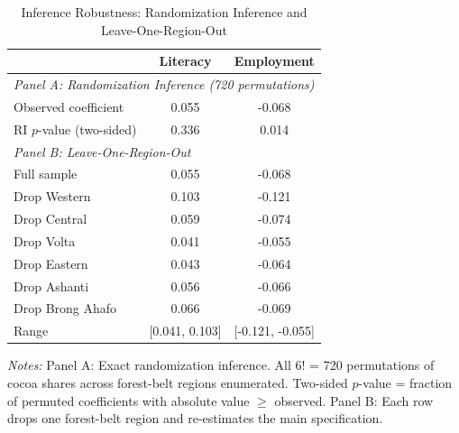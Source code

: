\begin{table}[htbp]
\centering
\caption{Inference Robustness: Randomization Inference and Leave-One-Region-Out}
\label{tab:ri_loo}
\begin{tabular}{lcc}
\hline\hline
& Literacy & Employment \\
\hline
\multicolumn{3}{l}{\textit{Panel A: Randomization Inference (720 permutations)}} \\
Observed coefficient & 0.055 & -0.068 \\
RI $p$-value (two-sided) & 0.336 & 0.014 \\
\hline
\multicolumn{3}{l}{\textit{Panel B: Leave-One-Region-Out}} \\
Full sample & 0.055 & -0.068 \\
Drop Western      & 0.103 & -0.121 \\
Drop Central      & 0.059 & -0.074 \\
Drop Volta        & 0.041 & -0.055 \\
Drop Eastern      & 0.043 & -0.064 \\
Drop Ashanti      & 0.056 & -0.066 \\
Drop Brong Ahafo  & 0.066 & -0.069 \\
Range & [0.041, 0.103] & [-0.121, -0.055] \\
\hline\hline
\end{tabular}
\begin{minipage}{0.95\textwidth}
\vspace{0.2cm}
\footnotesize
\textit{Notes:} Panel A: Exact randomization inference. All 6! = 720 permutations of cocoa shares across
forest-belt regions enumerated. Two-sided $p$-value = fraction of permuted coefficients with absolute
value $\geq$ observed.
Panel B: Each row drops one forest-belt region and re-estimates the main specification.
\end{minipage}
\end{table}
